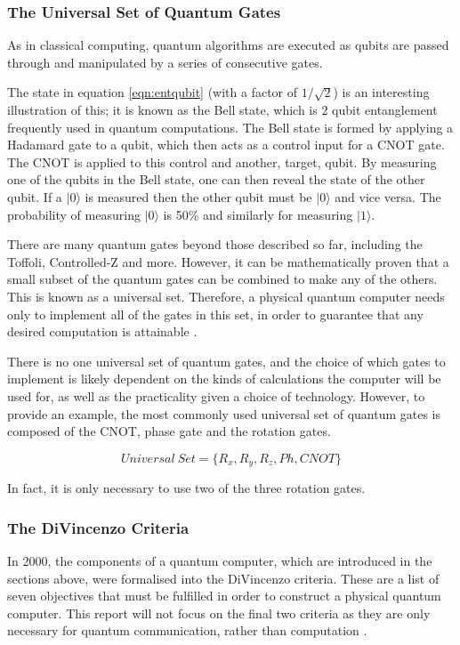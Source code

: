 \subsubsection{The Universal Set of Quantum Gates} \label{sec:USoQG}
As in classical computing, quantum algorithms are executed as qubits are passed through and manipulated by a series of consecutive gates. 

The state in equation \ref{eqn:entqubit} (with a factor of $1/\sqrt{2}$) is an interesting illustration of this; it is known as the Bell state, which is 2 qubit entanglement frequently used in quantum computations. The Bell state is formed by applying a Hadamard gate to a qubit, which then acts as a control input for a CNOT gate. The CNOT is applied to this control and another, target, qubit. \cite{mermin_quantum_2007} 
By measuring one of the qubits in the Bell state, one can then reveal the state of the other qubit. If a $|0\rangle$ is measured then the other qubit must be $|0\rangle$ and vice versa. The probability of measuring $|0\rangle$ is 50$\%$ and similarly for measuring $|1\rangle$. 

There are many quantum gates beyond those described so far, including the Toffoli, Controlled-Z and more. However, it can be mathematically proven that a small subset of the quantum gates can be combined to make any of the others. This is known as a universal set. Therefore, a physical quantum computer needs only to implement all of the gates in this set, in order to guarantee that any desired computation is attainable \cite{universalset}.

There is no one universal set of quantum gates, and the choice of which gates to implement is likely dependent on the kinds of calculations the computer will be used for, as well as the practicality given a choice of technology. However, to provide an example, the most commonly used universal set of quantum gates is composed of the CNOT, phase gate and the rotation gates.

\begin{equation}
    Universal\ Set = \{ R_x, R_y, R_z, Ph, CNOT \}
\end{equation}

In fact, it is only necessary to use two of the three rotation gates.

\subsubsection{The DiVincenzo Criteria}
In 2000, the components of a quantum computer, which are introduced in the sections above, were formalised into the DiVincenzo criteria. These are a list of seven objectives that must be fulfilled in order to construct a physical quantum computer. This report will not focus on the final two criteria as they are only necessary for quantum communication, rather than computation \cite{bergou_quantum_2021}.

